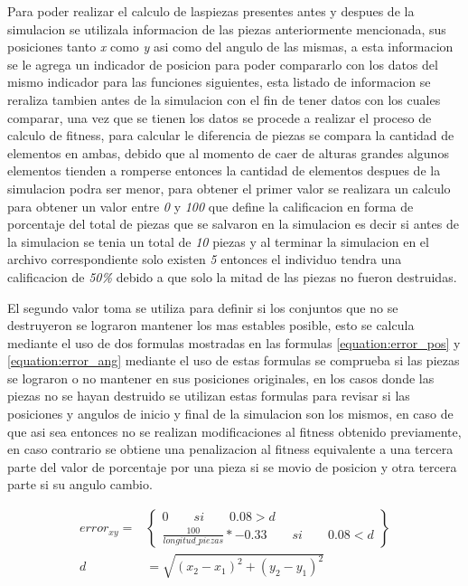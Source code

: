 Para poder realizar el calculo de laspiezas presentes antes y despues de la
simulacion se utilizala informacion de las piezas anteriormente mencionada, sus
posiciones tanto \textit{x} como \textit{y} asi como del angulo de las mismas, a
esta informacion se le agrega un indicador de posicion para poder compararlo con
los datos del mismo indicador para las funciones siguientes, esta listado de
informacion se reraliza tambien antes de la simulacion con el fin de tener datos
con los cuales comparar, una vez que se tienen los datos se procede a realizar
el proceso de calculo de fitness, para calcular le diferencia de piezas se
compara la cantidad de elementos en ambas, debido que al momento de caer de
alturas grandes algunos elementos tienden a romperse entonces la cantidad de
elementos despues de la simulacion podra ser menor, para obtener el primer valor
se realizara un calculo para obtener un valor entre \textit{0} y \textit{100}
que define la calificacion en forma de porcentaje del total de piezas que se
salvaron en la simulacion es decir si antes de la simulacion se tenia un total
de \textit{10} piezas y al terminar la simulacion en el archivo correspondiente
solo existen \textit{5} entonces el individuo tendra una calificacion de
\textit{50\%} debido a que solo la mitad de las piezas no fueron destruidas.

El segundo valor toma se utiliza para definir si los conjuntos que no se
destruyeron se lograron mantener los mas estables posible, esto se calcula
mediante el uso de dos formulas mostradas en las formulas
\ref{equation:error_pos} y \ref{equation:error_ang} mediante el uso de estas
formulas se comprueba si las piezas se lograron o no mantener en sus posiciones
originales, en los casos donde las piezas no se hayan destruido se utilizan
estas formulas para revisar si las posiciones y angulos de inicio y final de la
simulacion son los mismos, en caso de que asi sea entonces no se realizan
modificaciones al fitness obtenido previamente, en caso contrario se obtiene una
penalizacion al fitness equivalente a una tercera parte del valor de porcentaje
por una pieza si se movio de posicion y otra tercera parte si su angulo cambio.

\begin{equation}
    \begin{split}
      error_{xy} = & 
      \begin{Bmatrix}
        0 \qquad si \qquad 0.08 > d \\ 
        \frac{100}{longitud\_piezas} * -0.33 \qquad si \qquad 0.08 < d
      \end{Bmatrix} \\
       d & = \sqrt{(x_2 - x_1)^2 + (y_2 - y_1)^2}
    \end{split}
    \label{equation:error_pos}
\end{equation}

